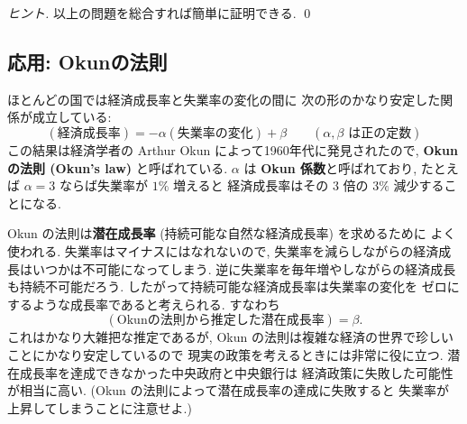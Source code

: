 \documentclass[12pt,twoside]{jarticle}
\begin{document}
\begin{proof}[ヒント]
  以上の問題を総合すれば簡単に証明できる. \qed
\end{proof}


\subsection{応用: Okunの法則}

ほとんどの国では経済成長率と失業率の変化の間に
次の形のかなり安定した関係が成立している:
\begin{equation*}
  (\text{経済成長率}) = - \alpha (\text{失業率の変化}) + \beta
  \qquad (\text{$\alpha, \beta$ は正の定数})
\end{equation*}
この結果は経済学者の Arthur Okun によって1960年代に発見されたので, 
{\bf Okun の法則 (Okun's law)} と呼ばれている.
$\alpha$ は {\bf Okun 係数}と呼ばれており, 
たとえば $\alpha=3$ ならば失業率が $1\%$ 増えると
経済成長率はその $3$ 倍の $3\%$ 減少することになる.

Okun の法則は{\bf 潜在成長率} (持続可能な自然な経済成長率) を求めるために
よく使われる. 
失業率はマイナスにはなれないので, 
失業率を減らしながらの経済成長はいつかは不可能になってしまう. 
逆に失業率を毎年増やしながらの経済成長も持続不可能だろう. 
したがって持続可能な経済成長率は失業率の変化を
ゼロにするような成長率であると考えられる. すなわち
\begin{equation*}
  (\text{Okunの法則から推定した潜在成長率}) = \beta.
\end{equation*}
これはかなり大雑把な推定であるが,
Okun の法則は複雑な経済の世界で珍しいことにかなり安定しているので
現実の政策を考えるときには非常に役に立つ.
潜在成長率を達成できなかった中央政府と中央銀行は
経済政策に失敗した可能性が相当に高い.
(Okun の法則によって潜在成長率の達成に失敗すると
失業率が上昇してしまうことに注意せよ.)
\end{document}
